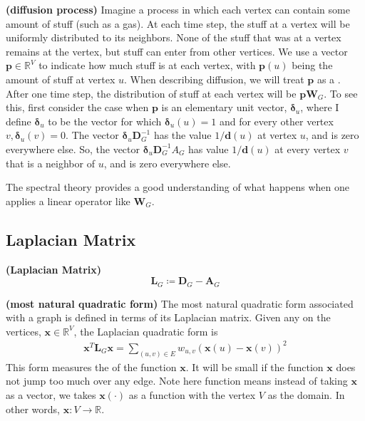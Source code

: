 \documentclass{article}
\newcommand{\bsl}[1]{\boldsymbol{#1}}
\newcommand{\bfs}[1]{\textbf{({#1}) }}
\begin{document}
\begin{rema}{\bfs{diffusion process}}
Imagine a process in which each vertex can contain some amount of stuff (such as a gas). At each time step, the stuff at a vertex will be uniformly distributed to its neighbors. None of the stuff that was at a vertex remains at the vertex, but stuff can enter from other vertices.
We use a vector $\bsl{p} \in \mathbb{R}^{V}$ to indicate how much stuff is at each vertex, with $\boldsymbol{p}(u)$ being the amount of stuff at vertex $u$. When describing diffusion, we will treat $\boldsymbol{p}$ as a . After one time step, the distribution of stuff at each vertex will be $\boldsymbol{p} \boldsymbol{W}_{G} .$ To see this, first consider the case when $\boldsymbol{p}$ is an elementary unit vector, $\boldsymbol{\delta}_{u}$, where I define $\boldsymbol{\delta}_{u}$ to be the vector for which $\boldsymbol{\delta}_{u}(u)=1$ and for every other vertex $v, \boldsymbol{\delta}_{u}(v)=0 .$ The vector $\boldsymbol{\delta}_{u} \boldsymbol{D}_{G}^{-1}$ has the value $1 / \boldsymbol{d}(u)$ at vertex $u$, and is zero everywhere else. So, the vector $\boldsymbol{\delta}_{u} \boldsymbol{D}_{G}^{-1} A_{G}$ has value $1 / \boldsymbol{d}(u)$ at every vertex $v$ that is a neighbor of $u$, and is zero everywhere else.
\end{rema}
\begin{rema}
The spectral theory provides a good understanding of what happens when one  applies a linear operator like $\boldsymbol{W}_{G}$.
\end{rema}
\subsection{Laplacian Matrix}
\begin{defa}{\bfs{Laplacian Matrix}}\label{matrix:lp}
$$
\boldsymbol{L}_{G}\coloneqq \boldsymbol{D}_{G}-\boldsymbol{A}_{G}
$$
\end{defa}

\begin{rema}{\bfs{most natural quadratic form}}
The most natural quadratic form associated with a graph is defined in terms of its Laplacian matrix.
Given any  on the vertices, $\boldsymbol{x} \in \mathbb{R}^{V}$, the Laplacian quadratic form is
\begin{align}
\boldsymbol{x}^{T} \boldsymbol{L}_{G} \boldsymbol{x}=\sum_{(u, v) \in E} w_{u, v}(\boldsymbol{x}(u)-\boldsymbol{x}(v))^{2} \label{matrix:lpeq1}
\end{align}
This form measures the  of the function $\boldsymbol{x} .$ It will be small if the function $\boldsymbol{x}$ does not jump too much over any edge. Note here function means instead of taking $\bsl{x}$ as a vector,  we takes $\bsl{x}(\cdot)$ as a function with the vertex $V$ as the domain. In other words, $\bsl{x}: V \rightarrow \mathbb{R}$.
\end{rema}
\end{document}
